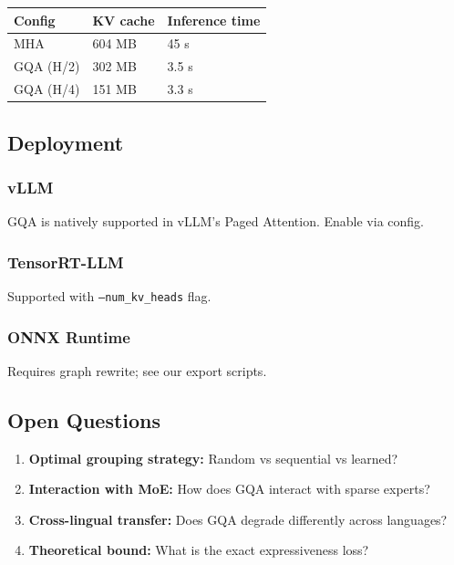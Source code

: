 \begin{table}[H]
\centering
\small
\begin{tabular}{lll}
\toprule
\textbf{Config} & \textbf{KV cache} & \textbf{Inference time} \\
\midrule
MHA & 604 MB & 45 s \\
GQA (H/2) & 302 MB & 3.5 s \\
GQA (H/4) & 151 MB & 3.3 s \\
\bottomrule
\end{tabular}
\end{table}

\subsection{Deployment}

\subsubsection{vLLM}

GQA is natively supported in vLLM's Paged Attention. Enable via config.

\subsubsection{TensorRT-LLM}

Supported with \texttt{--num\_kv\_heads} flag.

\subsubsection{ONNX Runtime}

Requires graph rewrite; see our export scripts.

\subsection{Open Questions}

\begin{enumerate}
\item \textbf{Optimal grouping strategy:} Random vs sequential vs learned?
\item \textbf{Interaction with MoE:} How does GQA interact with sparse experts?
\item \textbf{Cross-lingual transfer:} Does GQA degrade differently across languages?
\item \textbf{Theoretical bound:} What is the exact expressiveness loss?

\end{enumerate}
